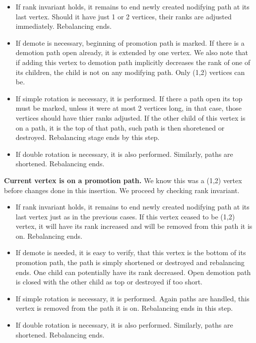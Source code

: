 \begin{itemize}

\item If rank invariant holds, it remains to end newly created nodifying path at its last vertex. Should it have just 1 or 2 vertices, their ranks are adjusted immediately. Rebalancing ends.

\item If demote is necessary, beginning of promotion path is marked. If there is a demotion path open already, it is extended by one vertex. We also note that if adding this vertex to demotion path implicitly decreases the rank of one of its children, the child is not on any modifying path. Only (1,2) vertices can be.

\item If simple rotation is necessary, it is performed. If there a path open its top must be marked, unless it were at most 2 vertices long, in that case, those vertices should have thier ranks adjusted. If the other child of this vertex is on a path, it is the top of that path, such path is then shoretened or destroyed. Rebalancing stage ends by this step.

\item If double rotation is necessary, it is also performed. Similarly, paths are shortened. Rebalancing ends.

\end{itemize}

\textbf{Current vertex is on a promotion path.} We know this was a (1,2) vertex before changes done in this insertion. We proceed by checking rank invariant. 

\begin{itemize}

\item If rank invariant holds, it remains to end newly created nodifying path at its last vertex just as in the previous cases. If this vertex ceased to be (1,2) vertex, it will have its rank increased and will be removed from this path it is on. Rebalancing ends.

\item If demote is needed, it is easy to verify, that this vertex is the bottom of its promotion path, the path is simply shortened or destroyed and rebalancing ends. One child can potentially have its rank decreased. Open demotion path is closed with the other child as top or destroyed if too short.

\item If simple rotation is necessary, it is performed. Again paths are handled, this vertex is removed from the path it is on. Rebalancing ends in this step.

\item If double rotation is necessary, it is also performed. Similarly, paths are shortened. Rebalancing ends.

\end{itemize}

